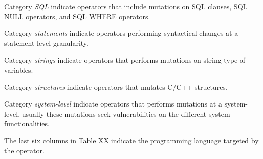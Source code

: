 Category \emph{SQL} indicate operators that include mutations on SQL clauses, SQL NULL operators, and SQL WHERE operators.

Category \emph{statements} indicate operators performing syntactical changes at a statement-level granularity.

Category \emph{strings} indicate operators that performs mutations on string type of variables.

Category \emph{structures} indicate operators that mutates C/C++ structures.

Category \emph{system-level} indicate operators that performs mutations at a system-level, usually these mutations seek vulnerabilities on the different system functionalities. 




The last six columns in Table XX indicate the programming language targeted by the operator.





